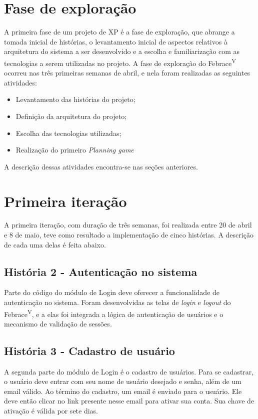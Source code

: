 \documentclass[a4paper,12pt,font=plain,header=plain]{abnt}
\begin{document}
  \section{Fase de exploração}
    A primeira fase de um projeto de XP é a fase de exploração\cite{beck04}, que abrange a tomada inicial de histórias, o levantamento inicial de aspectos relativos à arquitetura do sistema a ser desenvolvido e a escolha e familiarização com as tecnologias a serem utilizadas no projeto.
    A fase de exploração do Febrace\textsuperscript{V} ocorreu nas três primeiras semanas de abril, e nela foram realizadas as seguintes atividades:

    \begin{itemize}
      \item
        Levantamento das histórias do projeto;
      \item
        Definição da arquitetura do projeto;
      \item
        Escolha das tecnologias utilizadas;
      \item
        Realização do primeiro \textit{Planning game}
    \end{itemize}

  A descrição dessas atividades encontra-se nas seções anteriores.

  \section{Primeira iteração}
    A primeira iteração, com duração de três semanas, foi realizada entre 20 de abril e 8 de maio, teve como resultado a implementação de cinco histórias. A descrição de cada uma delas é feita abaixo.

    \subsection{História 2 - Autenticação no sistema}
      Parte do código do módulo de Login deve oferecer a funcionalidade de autenticação no sistema. Foram desenvolvidas as telas de \textit{login} e \textit{logout} do Febrace\textsuperscript{V}, e a elas foi integrada a lógica de autenticação de usuários e o mecanismo de validação de sessões.

    \subsection{História 3 - Cadastro de usuário}
      A segunda parte do módulo de Login é o cadastro de usuários. Para se cadastrar, o usuário deve entrar com seu nome de usuário desejado e senha, além de um email válido. Ao término do cadastro, um email é enviado para o usuário. Ele deve então clicar no link presente nesse email para ativar sua conta. Sua chave de ativação é válida por sete dias.
\end{document}
